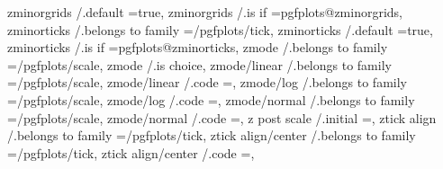 {{{zminorgrids              /.default                                                                                                      =true,
zminorgrids              /.is if                                                                                                        =pgfplots@zminorgrids,
zminorticks              /.belongs to family                                                                                            =/pgfplots/tick,
zminorticks              /.default                                                                                                      =true,
zminorticks              /.is if                                                                                                        =pgfplots@zminorticks,
zmode                    /.belongs to family                                                                                            =/pgfplots/scale,
zmode                    /.is choice,                                                                                             
zmode/linear             /.belongs to family                                                                                            =/pgfplots/scale,
zmode/linear             /.code                                                                                                         ={\pgfplots@zislineartrue},
zmode/log                /.belongs to family                                                                                            =/pgfplots/scale,
zmode/log                /.code                                                                                                         ={\pgfplots@zislinearfalse},
zmode/normal             /.belongs to family                                                                                            =/pgfplots/scale,
zmode/normal             /.code                                                                                                         ={\pgfplots@zislineartrue},
z post scale             /.initial                                                                                                      =,
ztick align              /.belongs to family                                                                                            =/pgfplots/tick,
ztick align/center       /.belongs to family                                                                                            =/pgfplots/tick,
ztick align/center       /.code                                                                                                         ={\def\pgfplots@ztickalignnum{2}},
}}}
